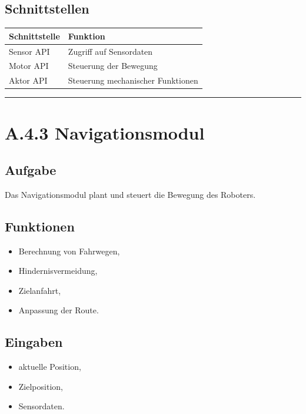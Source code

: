 \documentclass[
  a4paper,
  12pt,
  DIV=12,        %
  parskip=half,  %
  headings=small %
]{scrartcl}
\theoremstyle{definition}
\providecommand{\tightlist}{%
  \setlength{\itemsep}{0pt}\setlength{\parskip}{0pt}}
\theoremstyle{definition}
\providecommand{\tightlist}{%
  \setlength{\itemsep}{0pt}\setlength{\parskip}{0pt}}
\begin{document}
\subsection{Schnittstellen}\label{schnittstellen}

\begin{longtable}[]{@{}ll@{}}
\toprule\noalign{}
Schnittstelle & Funktion \\
\midrule\noalign{}
\endhead
\bottomrule\noalign{}
\endlastfoot
Sensor API & Zugriff auf Sensordaten \\
Motor API & Steuerung der Bewegung \\
Aktor API & Steuerung mechanischer Funktionen \\
\end{longtable}

\begin{center}\rule{0.5\linewidth}{0.5pt}\end{center}

\section{A.4.3 Navigationsmodul}\label{a.4.3-navigationsmodul}

\subsection{Aufgabe}\label{aufgabe-7}

Das Navigationsmodul plant und steuert die Bewegung des Roboters.

\subsection{Funktionen}\label{funktionen-1}

\begin{itemize}
\tightlist
\item
  Berechnung von Fahrwegen,
\item
  Hindernisvermeidung,
\item
  Zielanfahrt,
\item
  Anpassung der Route.
\end{itemize}

\subsection{Eingaben}\label{eingaben}

\begin{itemize}
\tightlist
\item
  aktuelle Position,
\item
  Zielposition,
\item
  Sensordaten.
\end{itemize}
\end{document}
